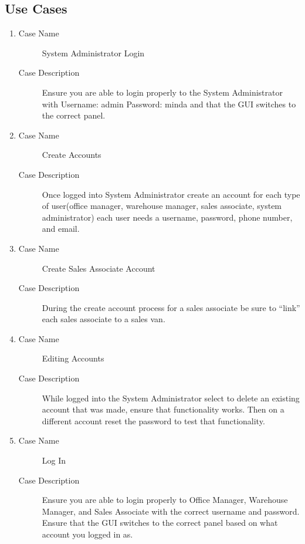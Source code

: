 \documentclass{report}
\begin{document}
\clearpage

\subsection{Use Cases}

\begin{enumerate}
  \item \begin{description}
          \item [Case Name] System Administrator Login
          \item [Case Description] Ensure you are able to login properly to the System Administrator with Username: admin Password: minda and that the GUI switches to the correct panel.
        \end{description}
  \item \begin{description}
          \item [Case Name] Create Accounts
          \item [Case Description] Once logged into System Administrator create an account for each type of user(office manager, warehouse manager, sales associate, system administrator)  each user needs a username, password, phone number, and email.
        \end{description}
  \item \begin{description}
          \item [Case Name] Create Sales Associate Account
          \item [Case Description] During the create account process for a sales associate be sure to “link” each sales associate to a sales van.
        \end{description}
  \item \begin{description}
          \item [Case Name] Editing Accounts
          \item [Case Description] While logged into the System Administrator select to delete an existing account that was made, ensure that functionality works. Then on a different account reset the password to test that functionality.
        \end{description}
  \item \begin{description}
          \item [Case Name] Log In
          \item [Case Description] Ensure you are able to login properly to Office Manager, Warehouse Manager, and Sales Associate with the correct username and password. Ensure that the GUI switches to the correct panel based on what account you logged in as.

\end{description}
\end{enumerate}
\end{document}
